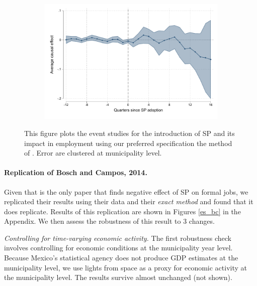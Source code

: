 \documentclass[oneside,11pt]{article}
\begin{document}
\begin{figure}[H]
\begin{center}
\begin{subfigure}{0.4\textwidth}
        \includegraphics[width=\textwidth]{Figuras/did_event_ch_e_t.pdf}
    \end{subfigure}
  
  \end{center}
    \scriptsize 
    This figure plots the event studies for the introduction of SP and its impact in employment using our preferred specification the method of \cite{deChaisemartin2020}. Error are clustered at municipality level.
\end{figure}



\paragraph{Replication of Bosch and Campos, 2014.} Given that \cite{Campos} is the only paper that finds negative effect of SP on formal jobs, we replicated their results using their data and their \textit{exact method} and found that it does replicate. Results of this replication are shown in Figures \ref{es_bc} in the Appendix.  We then assess the robustness of this result to 3 changes. 

\textit{Controlling for time-varying economic activity.} The first robustness check involves controlling for economic conditions at the municipality year level. Because Mexico's statistical agency does not produce GDP estimates at the municipality level, we use lights from space as a proxy for economic activity at the municipality level. The results survive almost unchanged (not shown). 
\end{document}
